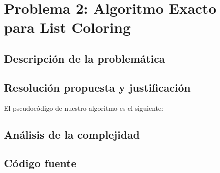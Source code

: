 \newpage
\section{Problema 2: Algoritmo Exacto para List Coloring}

\subsection{Descripción de la problemática}

\subsection{Resolución propuesta y justificación}

El pseudocódigo de nuestro algoritmo es el siguiente:



\subsection{Análisis de la complejidad}

\subsection{Código fuente}

% 
% 
% 

